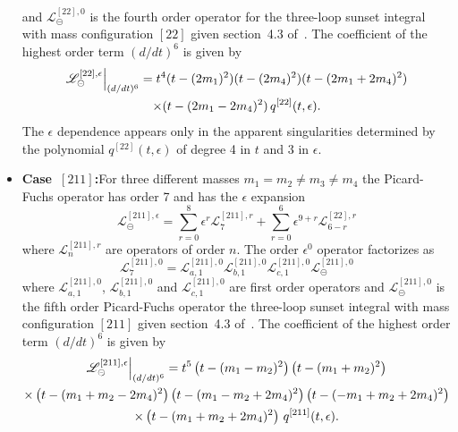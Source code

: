 \documentclass[a4paper,12pt]{article}
\numberwithin{equation}{section}
\numberwithin{figure}{subsection}
\theoremstyle{plain}
\theoremstyle{plain}
\theoremstyle{definition}
\theoremstyle{plain}
\theoremstyle{remark}
\theoremstyle{plain}
\def\su{\circleddash}
\begin{document}
\begin{itemize}
       and $\mathscr{L}^{[22],0}_\su$ is the fourth order operator for the
       three-loop sunset integral with mass configuration $[22]$ given  section~4.3 of~\cite{Lairez:2022zkj}.
    The coefficient of the highest order term $(d/dt)^6$    is given by
       \begin{multline}
                   \mathscr{L}^{[22],\epsilon}_\su\Big\vert_{(d/dt)^6}=
                   t^4(t-(2m_1)^2)(t-(2m_4)^2)(t-(2m_1+2m_4)^2)\cr\times(t-(2m_1-2m_4)^2)
                   \, q^{[22]}(t,\epsilon).
                 \end{multline}
                 The $\epsilon$ dependence appears only in the
                 apparent singularities determined by the polynomial
                 $q^{[22]}(t,\epsilon)$ of degree 4 in $t$ and $3$ in $\epsilon$.
     \item   {\bf Case~$[211]$:}For three different masses $m_1=m_2\neq m_3 \neq m_4$ the
  Picard-Fuchs operator has order 7 and has the $\epsilon$ expansion
  \begin{equation}
    \mathscr{L}^{[211],\epsilon}_\su=       \sum_{r=0}^8 \epsilon^r
    \mathscr{L}^{[211],r}_{7}+  \sum_{r=0}^6 \epsilon^{9+r}   \mathscr{L}^{[22],r}_{6-r}
  \end{equation}
   where  $ \mathscr{L}^{[211],r}_{n}$ 
  are operators of order $n$.
    The order $\epsilon^0$ operator factorizes as
  \begin{equation}
         \mathscr{L}^{[211],0}_{7}=   \mathscr{L}^{[211],0}_{a,1}  \mathscr{L}^{[211],0}_{b,1} \mathscr{L}^{[211],0}_{c,1}\mathscr{L}^{[211],0}_\su
       \end{equation}
        where  $ \mathscr{L}^{[211],0}_{a,1}$,  $
        \mathscr{L}^{[211],0}_{b,1}$ and  $ \mathscr{L}^{[211],0}_{c,1}$ are  first order operators
       and $\mathscr{L}^{[211],0}_\su$ is the fifth order Picard-Fuchs operator the
       three-loop sunset integral with mass configuration $[211]$
       given section~4.3 of~\cite{Lairez:2022zkj}.   The coefficient of the highest order term $(d/dt)^6$    is given by
       \begin{multline}
                   \mathscr{L}^{[211],\epsilon}_\su\Big\vert_{(d/dt)^6}=
                   t^5\left(t-(m_{1}-m_{2})^2\right) \left(t-(m_{1}+m_{2})^2\right)\cr\times
   \left(t-(m_{1}+m_{2}-2 m_{4})^2\right) \left(t-(m_{1}-m_{2}+2
   m_{4})^2\right) \left(t-(-m_{1}+m_{2}+2 m_{4})^2\right)\cr\times
   \left(t-(m_{1}+m_{2}+2 m_{4})^2\right)
                   \, q^{[211]}(t,\epsilon).
                 \end{multline}

\end{itemize}
\end{document}
